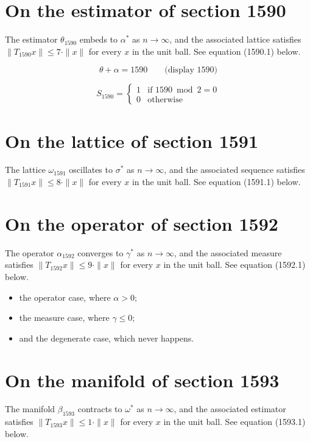 \documentclass{article}
\begin{document}
\section{On the estimator of section 1590}
The estimator $\theta_{1590}$ embeds to $\alpha^{*}$ as $n \to \infty$,
and the associated lattice satisfies $\|T_{1590} x\| \leq 7 \cdot \|x\|$
for every $x$ in the unit ball. See equation (1590.1) below.

$$
\theta + \alpha = 1590 \qquad \text{(display 1590)}
$$

\begin{equation}
S_{1590} = \begin{cases} 1 & \text{if } 1590 \bmod 2 = 0 \\ 0 & \text{otherwise} \end{cases}
\end{equation}

\section{On the lattice of section 1591}
The lattice $\omega_{1591}$ oscillates to $\sigma^{*}$ as $n \to \infty$,
and the associated sequence satisfies $\|T_{1591} x\| \leq 8 \cdot \|x\|$
for every $x$ in the unit ball. See equation (1591.1) below.

\section{On the operator of section 1592}
The operator $\alpha_{1592}$ converges to $\gamma^{*}$ as $n \to \infty$,
and the associated measure satisfies $\|T_{1592} x\| \leq 9 \cdot \|x\|$
for every $x$ in the unit ball. See equation (1592.1) below.

\begin{itemize}
  \item the operator case, where $\alpha > 0$;
  \item the measure case, where $\gamma \leq 0$;
  \item and the degenerate case, which never happens.
\end{itemize}

\section{On the manifold of section 1593}
The manifold $\beta_{1593}$ contracts to $\omega^{*}$ as $n \to \infty$,
and the associated estimator satisfies $\|T_{1593} x\| \leq 1 \cdot \|x\|$
for every $x$ in the unit ball. See equation (1593.1) below.
\end{document}

